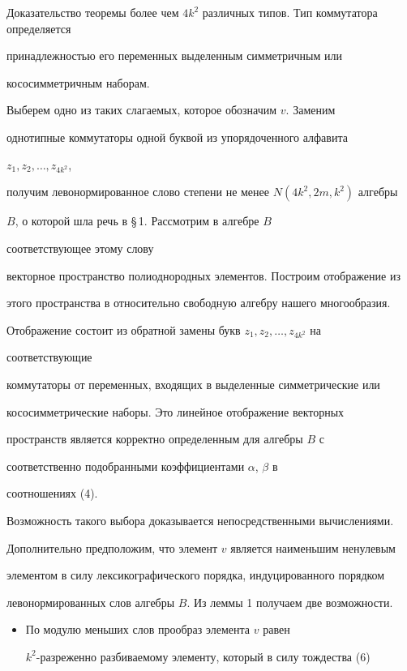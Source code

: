 \begin{pf*}{Доказательство теоремы}
более чем $4k^2$ различных типов. Тип коммутатора определяется


принадлежностью его переменных выделенным симметричным или


кососимметричным наборам.





Выберем одно из таких слагаемых, которое обозначим $v$. Заменим


однотипные коммутаторы одной буквой из упорядоченного алфавита


$z_1,z_2,\dotsc,z_{4k^2}$,


получим левонормированное слово степени не менее $N(4k^2,2m,k^2)$ алгебры


$B$, о которой шла речь в \S\,1. Рассмотрим в алгебре $B$


соответствующее этому слову


векторное пространство полиоднородных элементов. Построим отображение из


этого пространства в относительно свободную алгебру нашего многообразия.


Отображение состоит из обратной замены букв $z_1,z_2,\dotsc,z_{4k^2}$ на


соответствующие


коммутаторы от переменных, входящих в выделенные симметрические или


кососимметрические наборы. Это линейное отображение векторных


пространств является корректно определенным для алгебры $B$ с


соответственно подобранными коэффициентами $\alpha$, $\beta$ в


соотношениях (4).


Возможность такого выбора доказывается непосредственными вычислениями.





Дополнительно предположим, что элемент $v$ является наименьшим ненулевым


элементом в силу лексикографического порядка, индуцированного порядком


левонормированных слов алгебры $B$. Из леммы 1 получаем две возможности.


\begin{itemize}


\item[1.] По модулю меньших слов прообраз элемента $v$ равен


$k^2$-разреженно разбиваемому элементу, который в силу тождества (6)



\end{itemize}
\end{pf*}
